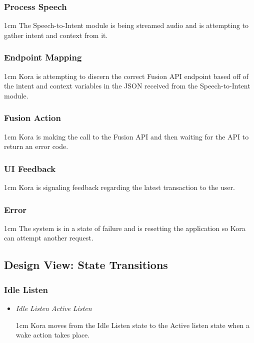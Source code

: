 \documentclass[onecolumn, draftclsnofoot,10pt, compsoc]{IEEEtran}
\def \botname{Kora\xspace}
\newenvironment{indentItem}[1][1cm]{\begin{adjustwidth}{#1}{}}{\end{adjustwidth}}
\begin{document}
	\subsubsection{Process Speech}
		\begin{indentItem}
			The Speech-to-Intent module is being streamed audio and is attempting to gather intent and context from it.
		\end{indentItem}
	
	\subsubsection{Endpoint Mapping}
		\begin{indentItem}
			\botname is attempting to discern the correct Fusion API endpoint based off of the intent and context variables in the JSON received from the Speech-to-Intent module.
		\end{indentItem}
		
	\subsubsection{Fusion Action}
		\begin{indentItem}
			\botname is making the call to the Fusion API and then waiting for the API to return an error code.
		\end{indentItem}
	
	\subsubsection{UI Feedback}
		\begin{indentItem}
			\botname is signaling feedback regarding the latest transaction to the user.
		\end{indentItem}
	
	\subsubsection{Error}
		\begin{indentItem}
			The system is in a state of failure and is resetting the application so \botname can attempt another request.
		\end{indentItem}
	
	
	\subsection{Design View: State Transitions}	
		\subsubsection{Idle Listen}
			\begin{itemize}
				\item \textit{Idle Listen \textrightarrow{}  Active Listen}
				\begin{indentItem}
					\botname moves from the Idle Listen state to the Active listen state when a wake action takes place.
				\end{indentItem}
			\end{itemize}
		
\end{document}
